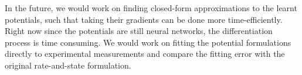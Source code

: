 {In the future, 
we would work on finding closed-form approximations to the learnt potentials, 
such that taking their gradients can be done more time-efficiently. 
Right now since the potentials are still neural networks, 
the differentiation process is time consuming. 
We would work on fitting the potential formulations directly to experimental measurements and compare the fitting error with the original rate-and-state formulation. 
}
\fi